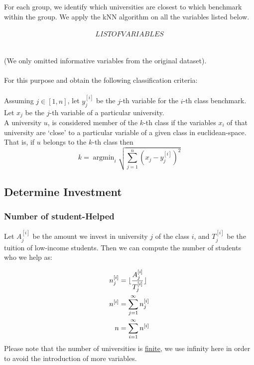 \documentclass[12pt]{article}
\DeclarePairedDelimiter\floor{\lfloor}{\rfloor}
\newcommand{\argmin}{\mathop{\mathrm{argmin}}}
\begin{document}
	For each group, we identify which universities are closest to which benchmark within the group. We apply the kNN algorithm on all the variables listed below.\\ \\
	\[LIST OF VARIABLES\]
	\\ \\
(We only omitted informative variables from the original dataset).\\ \\
For this purpose and obtain the following classification criteria:\\ \\
Assuming $j\in [1,n]$, let $y_j^{[i]}$ be the $j$-th variable for the $i$-th class benchmark.\\
Let $x_j$ be the $j$-th variable of a particular university.\\
	
A university $u$, is considered member of the $k$-th class if the variables $x_i$ of that university are `close' to a particular variable of a given class in euclidean-space.\\
	
	That is, if $u$ belongs to the $k$-th class then
	$$
		k = \argmin_{i} \sqrt{ \sum_{j=1}^n (x_j-y_j^{[i]})^2 }
	$$
	
	\subsection{Determine Investment}

	\subsubsection{Number of student-Helped}
		Let $A_j^{[i]}$ be the amount we invest in university $j$ of the class $i$, and $T_j^{[i]}$ be the tuition of low-income students. Then we can compute the number of students who we help as:

		\begin{align*}
			n_j^{[i]} &= \floor{\frac{A_j^{[i]}}{T_j^{[i]}}}\\
			n^{[i]} &= \sum_{j=1}^\infty n_j^{[i]}\\
			n &= \sum_{i=1}^\infty n^{[i]}
		\end{align*}
		Please note that the number of universities is \underline{finite}, we use infinity here in order to avoid the introduction of more variables.\\
\end{document}
